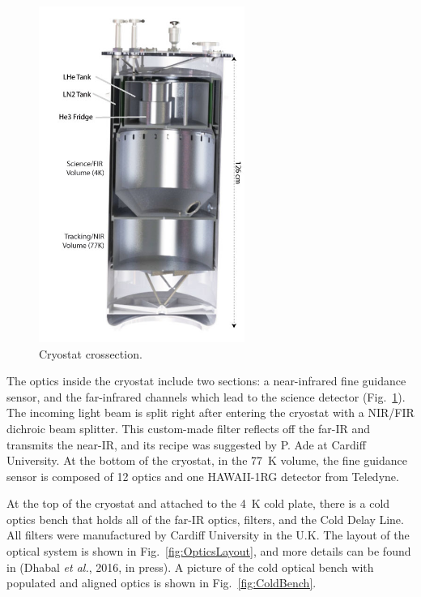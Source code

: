 \begin{figure}[!h]
		\centering
		\includegraphics[width=0.6\textwidth]{Figures/Dewar.jpg} 
		\caption[Cryostat crossection]{Cryostat crossection.}
		\label{fig:CryostatCrosssection}
\end{figure}

The optics inside the cryostat include two sections: a near-infrared fine guidance sensor, and the far-infrared channels which lead to the science detector (Fig.~\ref{fig:CryostatCrosssection}). The incoming light beam is split right after entering the cryostat with a NIR/FIR dichroic beam splitter. This custom-made filter reflects off the far-IR and transmits the near-IR, and its recipe was suggested by P. Ade at Cardiff University. At the bottom of the cryostat, in the \SI{77}{\kelvin} volume, the fine guidance sensor is composed of 12 optics and one HAWAII-1RG detector from Teledyne. 


At the top of the cryostat and attached to the \SI{4}{\kelvin} cold plate, there is a cold optics bench that holds all of the far-IR optics, filters, and the Cold Delay Line. All filters were manufactured by Cardiff University in the U.K. The layout of the optical system is shown in Fig.~\ref{fig:OpticsLayout}, and more details can be found in (Dhabal \textit{et al.}, 2016, in press). A picture of the cold optical bench with populated and aligned optics is shown in Fig.~\ref{fig:ColdBench}.

